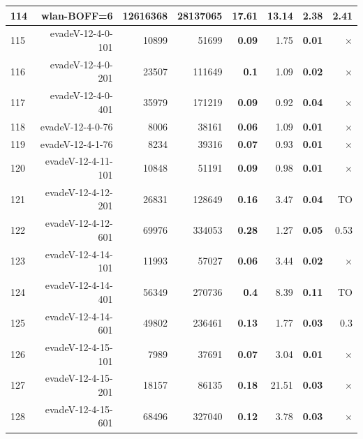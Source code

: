 \begin{longtable}{lrr@{\hskip 12pt}r@{\hskip 12pt}r@{\hskip 12pt}r@{\hskip 12pt}r@{\hskip 12pt}r}
114 & \multirow{1}{*}{wlan-BOFF=6} & \multirow{1}{*}{12616368} & \multirow{1}{*}{28137065} & 17.61 & \textbf{13.14} & \textbf{2.38} & 2.41 \\
\midrule
115 & \multirow{1}{*}{evadeV-12-4-0-101} & \multirow{1}{*}{10899} & \multirow{1}{*}{51699} & \textbf{0.09} & 1.75 & \textbf{0.01} & $\times$ \\
116 & \multirow{1}{*}{evadeV-12-4-0-201} & \multirow{1}{*}{23507} & \multirow{1}{*}{111649} & \textbf{0.1} & 1.09 & \textbf{0.02} & $\times$ \\
117 & \multirow{1}{*}{evadeV-12-4-0-401} & \multirow{1}{*}{35979} & \multirow{1}{*}{171219} & \textbf{0.09} & 0.92 & \textbf{0.04} & $\times$ \\
118 & \multirow{1}{*}{evadeV-12-4-0-76} & \multirow{1}{*}{8006} & \multirow{1}{*}{38161} & \textbf{0.06} & 1.09 & \textbf{0.01} & $\times$ \\
119 & \multirow{1}{*}{evadeV-12-4-1-76} & \multirow{1}{*}{8234} & \multirow{1}{*}{39316} & \textbf{0.07} & 0.93 & \textbf{0.01} & $\times$ \\
120 & \multirow{1}{*}{evadeV-12-4-11-101} & \multirow{1}{*}{10848} & \multirow{1}{*}{51191} & \textbf{0.09} & 0.98 & \textbf{0.01} & $\times$ \\
121 & \multirow{1}{*}{evadeV-12-4-12-201} & \multirow{1}{*}{26831} & \multirow{1}{*}{128649} & \textbf{0.16} & 3.47 & \textbf{0.04} & TO \\
122 & \multirow{1}{*}{evadeV-12-4-12-601} & \multirow{1}{*}{69976} & \multirow{1}{*}{334053} & \textbf{0.28} & 1.27 & \textbf{0.05} & 0.53 \\
123 & \multirow{1}{*}{evadeV-12-4-14-101} & \multirow{1}{*}{11993} & \multirow{1}{*}{57027} & \textbf{0.06} & 3.44 & \textbf{0.02} & $\times$ \\
124 & \multirow{1}{*}{evadeV-12-4-14-401} & \multirow{1}{*}{56349} & \multirow{1}{*}{270736} & \textbf{0.4} & 8.39 & \textbf{0.11} & TO \\
125 & \multirow{1}{*}{evadeV-12-4-14-601} & \multirow{1}{*}{49802} & \multirow{1}{*}{236461} & \textbf{0.13} & 1.77 & \textbf{0.03} & 0.3 \\
126 & \multirow{1}{*}{evadeV-12-4-15-101} & \multirow{1}{*}{7989} & \multirow{1}{*}{37691} & \textbf{0.07} & 3.04 & \textbf{0.01} & $\times$ \\
127 & \multirow{1}{*}{evadeV-12-4-15-201} & \multirow{1}{*}{18157} & \multirow{1}{*}{86135} & \textbf{0.18} & 21.51 & \textbf{0.03} & $\times$ \\
128 & \multirow{1}{*}{evadeV-12-4-15-601} & \multirow{1}{*}{68496} & \multirow{1}{*}{327040} & \textbf{0.12} & 3.78 & \textbf{0.03} & $\times$ \\

\end{longtable}
